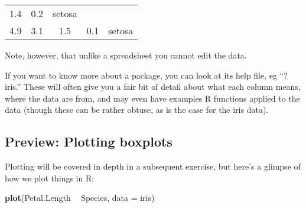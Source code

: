 \documentclass[]{book}
\newenvironment{Shaded}{\begin{snugshade}}{\end{snugshade}}
\newcommand{\KeywordTok}[1]{\textcolor[rgb]{0.13,0.29,0.53}{\textbf{#1}}}
\newcommand{\DataTypeTok}[1]{\textcolor[rgb]{0.13,0.29,0.53}{#1}}
\newcommand{\StringTok}[1]{\textcolor[rgb]{0.31,0.60,0.02}{#1}}
\newcommand{\OperatorTok}[1]{\textcolor[rgb]{0.81,0.36,0.00}{\textbf{#1}}}
\newcommand{\NormalTok}[1]{#1}
\theoremstyle{definition}
\theoremstyle{definition}
\theoremstyle{definition}
\theoremstyle{remark}
\begin{document}
\begin{longtable}[]{@{}ccccc@{}}
\begin{minipage}[t]{0.18\columnwidth}
1.4\strut
\end{minipage} & \begin{minipage}[t]{0.17\columnwidth}\centering\strut
0.2\strut
\end{minipage} & \begin{minipage}[t]{0.11\columnwidth}\centering\strut
setosa\strut
\end{minipage}\tabularnewline
\begin{minipage}[t]{0.18\columnwidth}\centering\strut
4.9\strut
\end{minipage} & \begin{minipage}[t]{0.17\columnwidth}\centering\strut
3.1\strut
\end{minipage} & \begin{minipage}[t]{0.18\columnwidth}\centering\strut
1.5\strut
\end{minipage} & \begin{minipage}[t]{0.17\columnwidth}\centering\strut
0.1\strut
\end{minipage} & \begin{minipage}[t]{0.11\columnwidth}\centering\strut
setosa\strut
\end{minipage}\tabularnewline
\bottomrule
\end{longtable}

Note, however, that unlike a spreadsheet you cannot edit the data.

If you want to know more about a package, you can look at its help file,
eg ``?iris.'' These will often give you a fair bit of detail about what
each column means, where the data are from, and may even have examples R
functions applied to the data (though these can be rather obtuse, as is
the case for the iris data).

\subsection{Preview: Plotting boxplots}\label{preview-plotting-boxplots}

Plotting will be covered in depth in a subsequent exercise, but here's a
glimpse of how we plot things in R:

\begin{Shaded}
\begin{Highlighting}[]
\KeywordTok{plot}\NormalTok{(Petal.Length }\OperatorTok{~}\StringTok{ }\NormalTok{Species, }\DataTypeTok{data =}\NormalTok{ iris)}
\end{Highlighting}
\end{Shaded}
\end{document}
